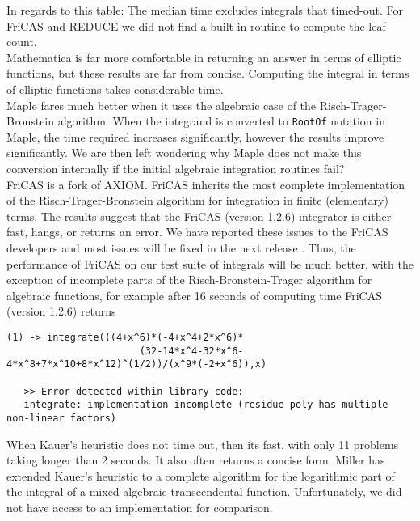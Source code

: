 \documentclass[12pt]{article}
\numberwithin{equation}{section}
\theoremstyle{definition}
\begin{document}
In regards to this table: The median time excludes integrals that timed-out. For 
FriCAS and REDUCE we did not find a built-in routine to compute the leaf count. \\

Mathematica is far more comfortable in returning an answer in terms of elliptic 
functions, but these results are far from concise. Computing the integral in 
terms of elliptic functions takes considerable time. \\

Maple fares much better when it uses the algebraic case of the Risch-Trager-Bronstein 
algorithm. When the integrand is converted to \texttt{RootOf} notation in Maple, 
the time required increases significantly, however the results improve significantly. 
We are then left wondering why Maple does not make this conversion internally if 
the initial algebraic integration routines fail? \\

FriCAS is a fork of AXIOM. FriCAS inherits the most complete implementation of the 
Risch-Trager-Bronstein algorithm for integration in finite (elementary) terms. The 
results suggest that the FriCAS (version 1.2.6) integrator is either fast, hangs, or 
returns an error. We have reported these issues to the FriCAS developers and most 
issues will be fixed in the next release \cite{fricas_sci.math.symbolic}. Thus, the 
performance of FriCAS on our test suite of integrals will be much better, with the 
exception of incomplete parts of the Risch-Bronstein-Trager algorithm for algebraic 
functions, for example after 16 seconds of computing time FriCAS (version 1.2.6) returns \\

\footnotesize
\begin{verbatim}
(1) -> integrate(((4+x^6)*(-4+x^4+2*x^6)*
                       (32-14*x^4-32*x^6-4*x^8+7*x^10+8*x^12)^(1/2))/(x^9*(-2+x^6)),x)
 
   >> Error detected within library code:
   integrate: implementation incomplete (residue poly has multiple non-linear factors)
\end{verbatim}
\normalsize

When Kauer's heuristic does not time out, then its fast, with only 11 problems taking 
longer than 2 seconds. It also often returns a concise form. Miller \cite{Miller2012} 
has extended Kauer's heuristic to a complete algorithm for the logarithmic part of 
the integral of a mixed algebraic-transcendental function. Unfortunately, we did not 
have access to an implementation for comparison. \\
\end{document}
